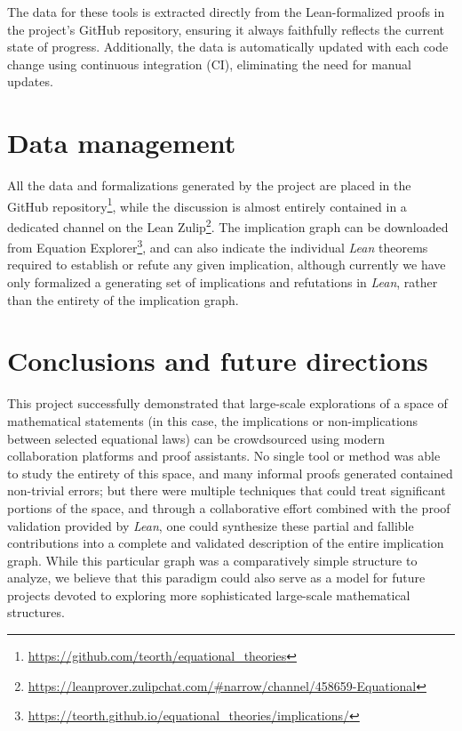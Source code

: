 \documentclass[12pt]{amsart}
\theoremstyle{definition}
\begin{document}
The data for these tools is extracted directly from the Lean-formalized proofs in the project's GitHub repository, ensuring it always faithfully reflects the current state of progress. Additionally, the data is automatically updated with each code change using continuous integration (CI), eliminating the need for manual updates.

\section{Data management}

All the data and formalizations generated by the project are placed in the GitHub repository\footnote{\url{https://github.com/teorth/equational_theories}}, while the discussion is almost entirely contained in a dedicated channel on the Lean Zulip\footnote{\url{https://leanprover.zulipchat.com/\#narrow/channel/458659-Equational}}.  The implication graph can be downloaded from Equation Explorer\footnote{\url{https://teorth.github.io/equational_theories/implications/}}, and can also indicate the individual \emph{Lean} theorems required to establish or refute any given implication, although currently we have only formalized a generating set of implications and refutations in \emph{Lean}, rather than the entirety of the implication graph.

\section{Conclusions and future directions}

This project successfully demonstrated that large-scale explorations of a space of mathematical statements (in this case, the implications or non-implications between selected equational laws) can be crowdsourced using modern collaboration platforms and proof assistants.  No single tool or method was able to study the entirety of this space, and many informal proofs generated contained non-trivial errors; but there were multiple techniques that could treat significant portions of the space, and through a collaborative effort combined with the proof validation provided by \emph{Lean}, one could synthesize these partial and fallible contributions into a complete and validated description of the entire implication graph.  While this particular graph was a comparatively simple structure to analyze, we believe that this paradigm could also serve as a model for future projects devoted to exploring more sophisticated large-scale mathematical structures.
\end{document}
